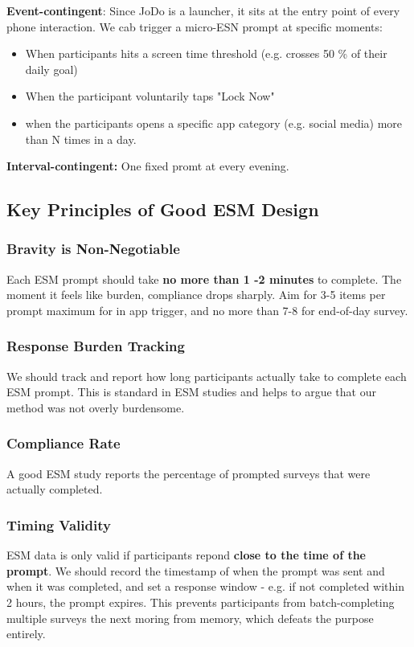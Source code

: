 \documentclass[12pt]{article}
\begin{document}
\textbf{Event-contingent}: Since JoDo is a launcher, it sits at the entry point of every phone interaction. We cab trigger a micro-ESN prompt at specific moments:
\begin{itemize}
    \item When participants hits a screen time threshold (e.g. crosses 50 \% of their daily goal)
    \item When the participant voluntarily taps "Lock Now"
    \item when the participants opens a specific app category (e.g. social media) more than N times in a day.
\end{itemize}

\textbf{Interval-contingent:} One fixed promt at every evening.

\subsection{Key Principles of Good ESM Design}
\subsubsection{Bravity is Non-Negotiable}
Each ESM prompt should take \textbf{no more than 1 -2 minutes} to complete. The moment it feels like burden, compliance drops sharply. Aim for 3-5 items per prompt maximum for in app trigger, and no more than 7-8 for end-of-day survey.
\subsubsection{Response Burden Tracking}
We should track and report how long participants actually take to complete each ESM prompt. This is standard in ESM studies and helps to argue that our method was not overly burdensome.

\subsubsection{Compliance Rate}
A good ESM study reports the percentage of prompted surveys that were actually completed.

\subsubsection{Timing Validity}
ESM data is only valid if participants repond \textbf{close to the time of the prompt}. We should record the timestamp of when the prompt was sent and when it was completed, and set a response window - e.g. if not completed within 2 hours, the prompt expires. This prevents participants from batch-completing multiple surveys the next moring from memory, which defeats the purpose entirely.
\end{document}
